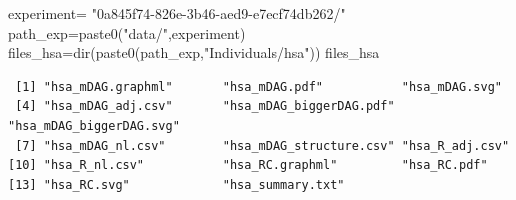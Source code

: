 \documentclass[
  letterpaper,
  DIV=11,
  numbers=noendperiod]{scrreprt}
\newenvironment{Shaded}{}{}
\newcommand{\FunctionTok}[1]{\textcolor[rgb]{0.38,0.69,0.94}{#1}}
\newcommand{\NormalTok}[1]{\textcolor[rgb]{0.67,0.70,0.75}{#1}}
\newcommand{\OtherTok}[1]{\textcolor[rgb]{0.15,0.68,0.38}{#1}}
\newcommand{\StringTok}[1]{\textcolor[rgb]{0.60,0.76,0.47}{#1}}
\begin{document}
\begin{Shaded}
\begin{Highlighting}[]
\NormalTok{experiment}\OtherTok{=}
  \StringTok{"0a845f74{-}826e{-}3b46{-}aed9{-}e7ecf74db262/"}
\NormalTok{path\_exp}\OtherTok{=}\FunctionTok{paste0}\NormalTok{(}\StringTok{"data/"}\NormalTok{,experiment)}
\NormalTok{files\_hsa}\OtherTok{=}\FunctionTok{dir}\NormalTok{(}\FunctionTok{paste0}\NormalTok{(path\_exp,}\StringTok{"Individuals/hsa"}\NormalTok{))}
\NormalTok{files\_hsa}
\end{Highlighting}
\end{Shaded}

\begin{verbatim}
 [1] "hsa_mDAG.graphml"       "hsa_mDAG.pdf"           "hsa_mDAG.svg"          
 [4] "hsa_mDAG_adj.csv"       "hsa_mDAG_biggerDAG.pdf" "hsa_mDAG_biggerDAG.svg"
 [7] "hsa_mDAG_nl.csv"        "hsa_mDAG_structure.csv" "hsa_R_adj.csv"         
[10] "hsa_R_nl.csv"           "hsa_RC.graphml"         "hsa_RC.pdf"            
[13] "hsa_RC.svg"             "hsa_summary.txt"       
\end{verbatim}
\end{document}
